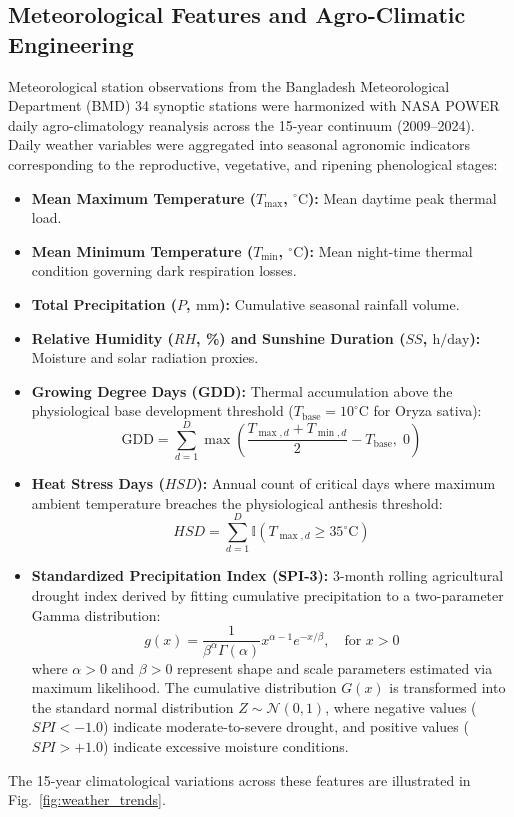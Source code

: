 \documentclass[conference]{IEEEtran}
\begin{document}
\subsection{Meteorological Features and Agro-Climatic Engineering}
Meteorological station observations from the Bangladesh Meteorological Department (BMD) 34 synoptic stations were harmonized with NASA POWER daily agro-climatology reanalysis across the 15-year continuum (2009--2024). Daily weather variables were aggregated into seasonal agronomic indicators corresponding to the reproductive, vegetative, and ripening phenological stages:
\begin{itemize}
    \item \textbf{Mean Maximum Temperature ($T_{\max}$, $^\circ\text{C}$):} Mean daytime peak thermal load.
    \item \textbf{Mean Minimum Temperature ($T_{\min}$, $^\circ\text{C}$):} Mean night-time thermal condition governing dark respiration losses.
    \item \textbf{Total Precipitation ($P$, $\text{mm}$):} Cumulative seasonal rainfall volume.
    \item \textbf{Relative Humidity ($RH$, \%) and Sunshine Duration ($SS$, $\text{h/day}$):} Moisture and solar radiation proxies.
    \item \textbf{Growing Degree Days (GDD):} Thermal accumulation above the physiological base development threshold ($T_{\text{base}} = 10^\circ\text{C}$ for Oryza sativa):
    \begin{equation}
    \text{GDD} = \sum_{d=1}^{D} \max\left( \frac{T_{\max, d} + T_{\min, d}}{2} - T_{\text{base}}, \; 0 \right)
    \end{equation}
    \item \textbf{Heat Stress Days ($HSD$):} Annual count of critical days where maximum ambient temperature breaches the physiological anthesis threshold:
    \begin{equation}
    HSD = \sum_{d=1}^{D} \mathbb{I}(T_{\max, d} \ge 35^\circ\text{C})
    \end{equation}
    \item \textbf{Standardized Precipitation Index (SPI-3):} 3-month rolling agricultural drought index derived by fitting cumulative precipitation to a two-parameter Gamma distribution:
    \begin{equation}
    g(x) = \frac{1}{\beta^\alpha \Gamma(\alpha)} x^{\alpha - 1} e^{-x/\beta}, \quad \text{for } x > 0
    \end{equation}
    where $\alpha > 0$ and $\beta > 0$ represent shape and scale parameters estimated via maximum likelihood. The cumulative distribution $G(x)$ is transformed into the standard normal distribution $Z \sim \mathcal{N}(0, 1)$, where negative values ($SPI < -1.0$) indicate moderate-to-severe drought, and positive values ($SPI > +1.0$) indicate excessive moisture conditions.
\end{itemize}
The 15-year climatological variations across these features are illustrated in Fig.~\ref{fig:weather_trends}.
\end{document}
